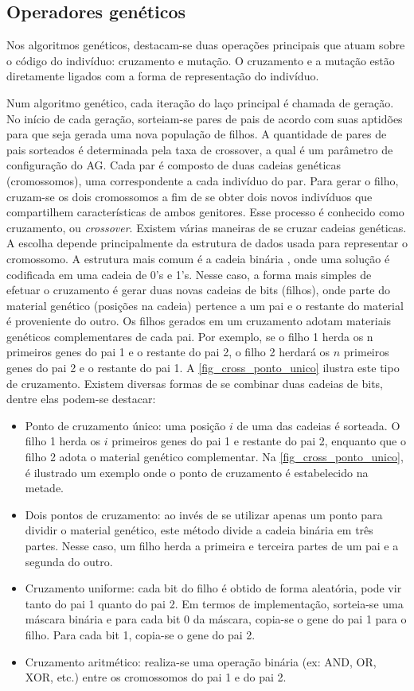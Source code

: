 \subsection{Operadores genéticos}
Nos algoritmos genéticos, destacam-se duas operações principais que atuam sobre o código do indivíduo: cruzamento e mutação. O cruzamento e a mutação estão diretamente ligados com a forma de representação do indivíduo.

Num algoritmo genético, cada iteração do laço principal é chamada de geração. No início de cada geração, sorteiam-se pares de pais de acordo com suas aptidões para que seja gerada uma nova população de filhos. A quantidade de pares de pais sorteados é determinada pela taxa de crossover, a qual é um parâmetro de configuração do AG. Cada par é composto de duas cadeias genéticas (cromossomos), uma correspondente a cada indivíduo do par. Para gerar o filho, cruzam-se os dois cromossomos a fim de se obter dois novos indivíduos que compartilhem características de ambos genitores. Esse processo é conhecido como cruzamento, ou \textit{crossover}. Existem várias maneiras de se cruzar cadeias genéticas. A escolha depende principalmente da estrutura de dados usada para representar o cromossomo. A estrutura mais comum é a cadeia binária \cite{Goldberg1989}, onde uma solução é codificada em uma cadeia de 0's e 1's. Nesse caso, a forma mais simples de efetuar o cruzamento é gerar duas novas cadeias de bits (filhos), onde parte do material genético (posições na cadeia) pertence a um pai e o restante do material é proveniente do outro. Os filhos gerados em um cruzamento adotam materiais genéticos complementares de cada pai. Por exemplo, se o filho 1 herda os n primeiros genes do pai 1 e o restante do pai 2, o filho 2 herdará os $n$ primeiros genes do pai 2 e o restante do pai 1. A \autoref{fig_cross_ponto_unico} ilustra este tipo de cruzamento. Existem diversas formas de se combinar duas cadeias de bits, dentre elas podem-se destacar:

\begin{itemize}  
	\item Ponto de cruzamento único: uma posição $i$ de uma das cadeias é sorteada. O filho 1 herda os $i$ primeiros genes do pai 1 e restante do pai 2, enquanto que o filho 2 adota o material genético complementar. Na \autoref{fig_cross_ponto_unico}, é ilustrado um exemplo onde o ponto de cruzamento é estabelecido na metade.
	\item Dois pontos de cruzamento: ao invés de se utilizar apenas um ponto para dividir o material genético, este método divide a cadeia binária em três partes. Nesse caso, um filho herda a primeira e terceira partes de um pai e a segunda do outro.
	\item Cruzamento uniforme: cada bit do filho é obtido de forma aleatória, pode vir tanto do pai 1 quanto do pai 2. Em termos de implementação, sorteia-se uma máscara binária e para cada bit 0 da máscara, copia-se o gene do pai 1 para o filho. Para cada bit 1, copia-se o gene do pai 2.
	\item Cruzamento aritmético: realiza-se uma operação binária (ex: AND, OR, XOR, etc.) entre os cromossomos do pai 1 e do pai 2.
\end{itemize}

